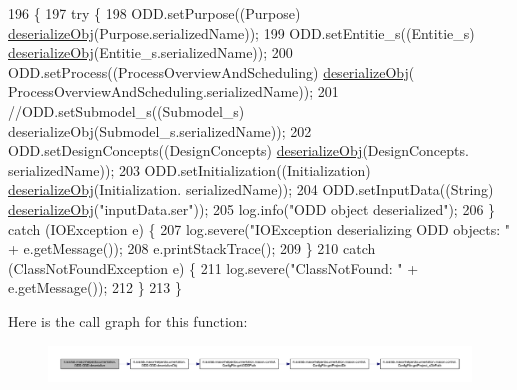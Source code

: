 \begin{DoxyCode}
196                                     \{
197         \textcolor{keywordflow}{try} \{
198             ODD.setPurpose((Purpose) \hyperlink{classit_1_1isislab_1_1masonhelperdocumentation_1_1_o_d_d_1_1_o_d_d_aa78df716eeec3477e70f23918ca29b6b}{deserializeObj}(Purpose.serializedName));
199             ODD.setEntitie\_s((Entitie\_s) \hyperlink{classit_1_1isislab_1_1masonhelperdocumentation_1_1_o_d_d_1_1_o_d_d_aa78df716eeec3477e70f23918ca29b6b}{deserializeObj}(Entitie\_s.serializedName));
200             ODD.setProcess((ProcessOverviewAndScheduling) \hyperlink{classit_1_1isislab_1_1masonhelperdocumentation_1_1_o_d_d_1_1_o_d_d_aa78df716eeec3477e70f23918ca29b6b}{deserializeObj}(
      ProcessOverviewAndScheduling.serializedName));
201             \textcolor{comment}{//ODD.setSubmodel\_s((Submodel\_s) deserializeObj(Submodel\_s.serializedName));}
202             ODD.setDesignConcepts((DesignConcepts) \hyperlink{classit_1_1isislab_1_1masonhelperdocumentation_1_1_o_d_d_1_1_o_d_d_aa78df716eeec3477e70f23918ca29b6b}{deserializeObj}(DesignConcepts.
      serializedName));
203             ODD.setInitialization((Initialization) \hyperlink{classit_1_1isislab_1_1masonhelperdocumentation_1_1_o_d_d_1_1_o_d_d_aa78df716eeec3477e70f23918ca29b6b}{deserializeObj}(Initialization.
      serializedName));
204             ODD.setInputData((String) \hyperlink{classit_1_1isislab_1_1masonhelperdocumentation_1_1_o_d_d_1_1_o_d_d_aa78df716eeec3477e70f23918ca29b6b}{deserializeObj}(\textcolor{stringliteral}{"inputData.ser"}));
205             log.info(\textcolor{stringliteral}{"ODD object deserialized"});
206         \} \textcolor{keywordflow}{catch} (IOException e) \{
207             log.severe(\textcolor{stringliteral}{"IOException deserializing ODD objects: "} + e.getMessage());
208             e.printStackTrace();
209         \}
210         \textcolor{keywordflow}{catch} (ClassNotFoundException e) \{
211             log.severe(\textcolor{stringliteral}{"ClassNotFound: "} + e.getMessage());
212         \}
213     \}
\end{DoxyCode}


Here is the call graph for this function\-:\nopagebreak
\begin{figure}[H]
\begin{center}
\leavevmode
\includegraphics[width=350pt]{classit_1_1isislab_1_1masonhelperdocumentation_1_1_o_d_d_1_1_o_d_d_aef969a9a32bbae5c690470582581220e_cgraph}
\end{center}
\end{figure}


